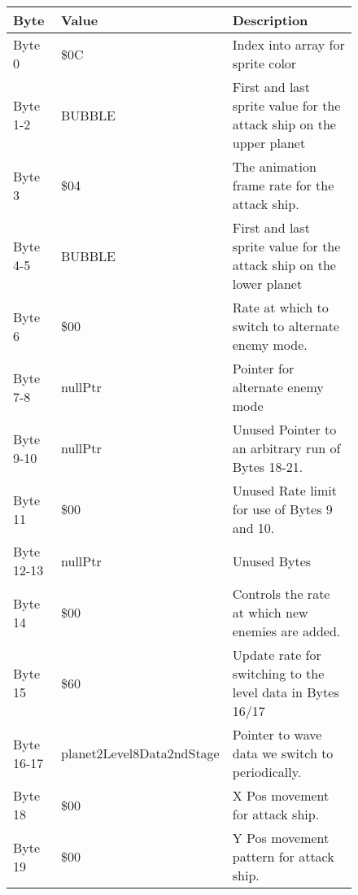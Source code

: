 \begin{figure}[H]
  {
  \setlength{\tabcolsep}{3.0pt}
  \setlength\cmidrulewidth{\heavyrulewidth} %
  \begin{adjustbox}{width=12cm}

\begin{tabular}{lll}
\toprule
 Byte       & Value                     & Description                                                         \\
\midrule
 Byte 0     & \$0C                       & Index into array for sprite color                                   \\
 Byte 1-2   & BUBBLE                    & First and last sprite value for the attack ship on the upper planet \\
 Byte 3     & \$04                       & The animation frame rate for the attack ship.                       \\
 Byte 4-5   & BUBBLE                    & First and last sprite value for the attack ship on the lower planet \\
 Byte 6     & \$00                       & Rate at which to switch to alternate enemy mode.                    \\
 Byte 7-8   & nullPtr                   & Pointer for alternate enemy mode                                    \\
 Byte 9-10  & nullPtr                   & Unused Pointer to an arbitrary run of Bytes 18-21.                  \\
 Byte 11    & \$00                       & Unused Rate limit for use of Bytes 9 and 10.                        \\
 Byte 12-13 & nullPtr                   & Unused Bytes                                                        \\
 Byte 14    & \$00                       & Controls the rate at which new enemies are added.                   \\
 Byte 15    & \$60                       & Update rate for switching to the level data in Bytes 16/17          \\
 Byte 16-17 & planet2Level8Data2ndStage & Pointer to wave data we switch to periodically.                     \\
 Byte 18    & \$00                       & X Pos movement for attack ship.                                     \\
 Byte 19    & \$00                       & Y Pos movement pattern for attack ship.                             \\

\end{tabular}
\end{adjustbox}}
\end{figure}
